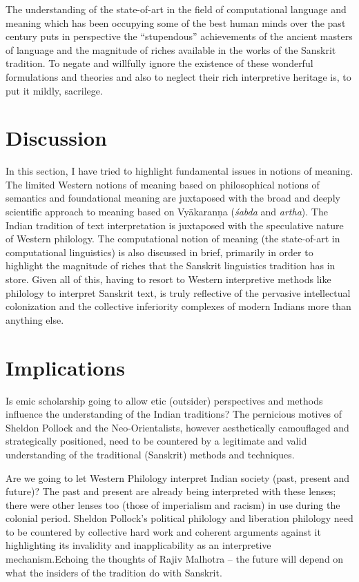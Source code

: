 The understanding of the state-of-art in the field of computational language and meaning which has been occupying some of the best human minds over the past century puts in perspective the “stupendous” achievements of the ancient masters of language and the magnitude of riches available in the works of the Sanskrit tradition. To negate and willfully ignore the existence of these wonderful formulations and theories and also to neglect their rich interpretive heritage is, to put it mildly, sacrilege.


\section*{Discussion}

\vskip -7pt

In this section, I have tried to highlight fundamental issues in notions of meaning. The limited Western notions of meaning based on philosophical notions of semantics and foundational meaning are juxtaposed with the broad and deeply scientific approach to meaning based on Vyākaranṇa (\textit{śabda} and \textit{artha}). The Indian tradition of text interpretation is juxtaposed with the speculative nature of Western philology. The computational notion of meaning (the state-of-art in computational linguistics) is also discussed in brief, primarily in order to highlight the magnitude of riches that the Sanskrit linguistics tradition has in store. Given all of this, having to resort to Western interpretive methods like philology to interpret Sanskrit text, is truly reflective of the pervasive intellectual colonization and the collective inferiority complexes of modern Indians more than anything else.


\section*{Implications}

\vskip -7pt

Is emic scholarship going to allow etic (outsider) perspectives and methods influence the understanding of the Indian traditions? The pernicious motives of Sheldon Pollock and the Neo-Orientalists, however aesthetically camouflaged and strategically positioned, need to be countered by a legitimate and valid understanding of the traditional (Sanskrit) methods and techniques.

Are we going to let Western Philology interpret Indian society (past, present and future)? The past and present are already being interpreted with these lenses; there were other lenses too (those of imperialism and racism) in use during the colonial period. Sheldon Pollock’s political philology and liberation philology need to be countered by collective hard work and coherent arguments against it highlighting its invalidity and inapplicability as an interpretive mechanism.Echoing the thoughts of Rajiv Malhotra – the future will depend on what the insiders of the tradition do with Sanskrit.

